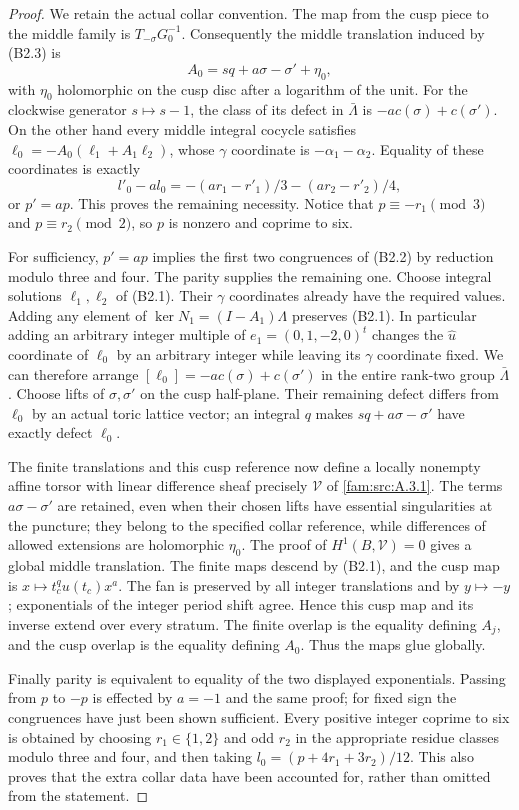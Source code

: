 \begin{proof}
We retain the actual collar convention. The map from the cusp piece to the middle family is $T_{-\sigma}G_0^{-1}$. Consequently the middle translation induced by (B2.3) is
\[
 A_0=sq+a\sigma-\sigma'+\eta_0,
\]
with $\eta_0$ holomorphic on the cusp disc after a logarithm of the unit. For the clockwise generator $s\mapsto s-1$, the class of its defect in $\bar\Lambda$ is $-a c(\sigma)+c(\sigma')$. On the other hand every middle integral cocycle satisfies
$\ell_0=-A_0(\ell_1+A_1\ell_2)$, whose $\gamma$ coordinate is $-\alpha_1-\alpha_2$. Equality of these coordinates is exactly
\[
 l'_0-a l_0=-(ar_1-r'_1)/3-(ar_2-r'_2)/4,
\]
or $p'=ap$. This proves the remaining necessity. Notice that $p\equiv-r_1\pmod3$ and $p\equiv r_2\pmod2$, so $p$ is nonzero and coprime to six.

For sufficiency, $p'=ap$ implies the first two congruences of (B2.2) by reduction modulo three and four. The parity supplies the remaining one. Choose integral solutions $\ell_1,\ell_2$ of (B2.1). Their $\gamma$ coordinates already have the required values. Adding any element of $\ker N_1=(I-A_1)\Lambda$ preserves (B2.1). In particular adding an arbitrary integer multiple of $e_1=(0,1,-2,0)^t$ changes the $\widehat u$ coordinate of $\ell_0$ by an arbitrary integer while leaving its $\gamma$ coordinate fixed. We can therefore arrange
$[\ell_0]=-a c(\sigma)+c(\sigma')$ in the entire rank-two group $\bar\Lambda$. Choose lifts of $\sigma,\sigma'$ on the cusp half-plane. Their remaining defect differs from $\ell_0$ by an actual toric lattice vector; an integral $q$ makes $sq+a\sigma-\sigma'$ have exactly defect $\ell_0$.

The finite translations and this cusp reference now define a locally nonempty affine torsor with linear difference sheaf precisely $\mathcal V$ of \ref{fam:src:A.3.1}. The terms $a\sigma-\sigma'$ are retained, even when their chosen lifts have essential singularities at the puncture; they belong to the specified collar reference, while differences of allowed extensions are holomorphic $\eta_0$. The proof of $H^1(B,\mathcal V)=0$ gives a global middle translation. The finite maps descend by (B2.1), and the cusp map is $x\mapsto t_c^qu(t_c)x^a$. The fan is preserved by all integer translations and by $y\mapsto-y$; exponentials of the integer period shift agree. Hence this cusp map and its inverse extend over every stratum. The finite overlap is the equality defining $A_j$, and the cusp overlap is the equality defining $A_0$. Thus the maps glue globally.

Finally parity is equivalent to equality of the two displayed exponentials. Passing from $p$ to $-p$ is effected by $a=-1$ and the same proof; for fixed sign the congruences have just been shown sufficient. Every positive integer coprime to six is obtained by choosing $r_1\in\{1,2\}$ and odd $r_2$ in the appropriate residue classes modulo three and four, and then taking $l_0=(p+4r_1+3r_2)/12$. This also proves that the extra collar data have been accounted for, rather than omitted from the statement.
\end{proof}

